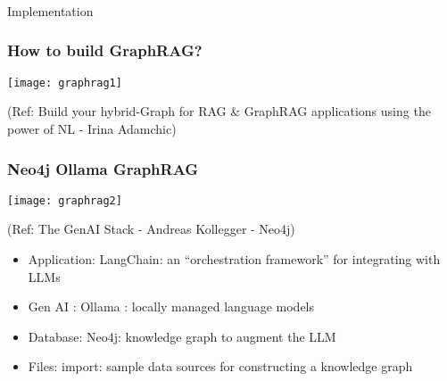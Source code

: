 \begin{frame}[fragile]\frametitle{}
\begin{center}
{\Large Implementation}
\end{center}
\end{frame}


\begin{frame}[fragile]\frametitle{How to build GraphRAG?}

	\begin{center}
	\texttt{[image: graphrag1]}
	
	{\tiny (Ref: Build your hybrid-Graph for RAG \& GraphRAG applications using the power of NL - Irina Adamchic)}
	\end{center}
	
\end{frame}


\begin{frame}[fragile]\frametitle{Neo4j Ollama GraphRAG}

	\begin{center}
	\texttt{[image: graphrag2]}
	
	{\tiny (Ref: The GenAI Stack - Andreas Kollegger - Neo4j)}
	\end{center}
	
	    \begin{itemize}
        \item Application: LangChain: an ``orchestration framework'' for integrating with LLMs
		\item Gen AI : Ollama : locally managed language models
		\item Database: Neo4j: knowledge graph to augment the LLM
		\item Files: import: sample data sources for constructing a knowledge graph
    \end{itemize}
\end{frame}

